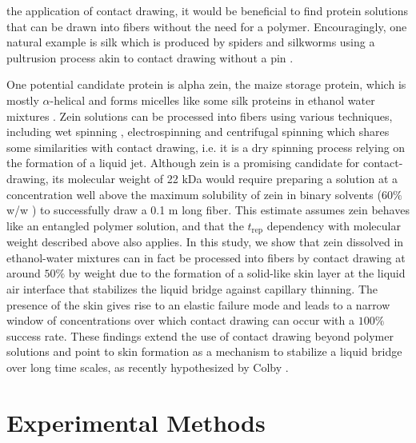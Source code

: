 \documentclass[lineno]{JFM-FLM_Au}
\begin{document}
the application of contact drawing, it would be beneficial to find protein solutions that can be drawn into fibers without the need for a polymer. Encouragingly, one natural example is silk which is produced by spiders and silkworms using a pultrusion process \cite{sparkes_analysis_2017} akin to contact drawing without a pin \cite{ni_biomimetic_2022}.

One potential candidate protein is alpha zein, the maize storage protein, which is mostly $\alpha$-helical \cite{argos_structural_1982} and forms micelles like some silk proteins in ethanol water mixtures \cite{parent_hierarchical_2018,uzun_characterization_2017}. Zein solutions can be processed into fibers using various techniques, including wet spinning \cite{cui_development_2022}, electrospinning \cite{rahman_fabrication_2023} and centrifugal spinning \cite{brum_facile_2025} which shares some similarities with contact drawing, i.e. it is a dry spinning process relying on the formation of a liquid jet. 
Although zein is a promising candidate for contact-drawing, its molecular weight of 22 kDa would require preparing a solution at a concentration well above the maximum solubility of zein in binary solvents ($60\%$ w/w \cite{shukla_zein_2001}) to successfully draw a 0.1 m long fiber.
This estimate assumes zein behaves like an entangled polymer solution, and that the $t_{\text{rep}}$ dependency with molecular weight described above \cite{chowdhry_polymer_2021} also applies. 
In this study, we show that zein dissolved in ethanol-water mixtures can in fact be processed into fibers by contact drawing at around $50\%$ by weight due to the formation of a solid-like skin layer at the liquid air interface that stabilizes the liquid bridge against capillary thinning. The presence of the skin gives rise to an elastic failure mode and leads to a narrow window of concentrations over which contact drawing can occur with a $100\%$ success rate. These findings extend the use of contact drawing beyond polymer solutions and point to skin formation as a mechanism to stabilize a liquid bridge over long time scales, as recently hypothesized by Colby \cite{colby_fiber_2023}. 

\section{Experimental Methods}
\end{document}
